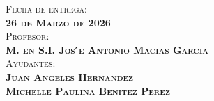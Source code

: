 \begin{titlepage}
\begin{minipage}[c][0.81\textheight][t]{0.75\textwidth}
\begin{center}
			\textsc{{Fecha de entrega: \\ \textbf{26 de Marzo de 2026}}}\\[1cm]        
			
			\textsc{{Profesor: \\ \textbf{M. en S.I. Jos ́e Antonio Macias Garcia}}}\\[1cm]  
			
			\textsc{Ayudantes: \\ \textbf{Juan Angeles Hernandez \\ Michelle Paulina Benitez Perez 
			} }
			
			
			\vspace{0.5cm}
		\end{center}
	\end{minipage}
\end{titlepage}
